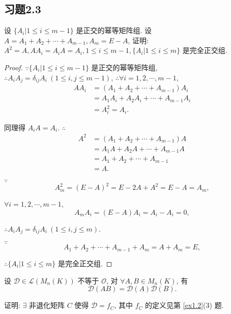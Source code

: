 \documentclass[color=black,device=normal,lang=cn,mode=geye]{elegantnote}
\begin{document}
\subsection{习题2.3}
\begin{exercise}\label{ex3.1}
    设 $\{A_i|1\leq i\leq m-1\}$ 是正交的幂等矩阵组. 设 $A=A_1+A_2+\cdots+A_{m-1},A_m=E-A$, 证明: $A^2=A,AA_i=A_iA=A_i,1\leq i\leq m-1,\{A_i|1\leq i\leq m\}$ 是完全正交组.
\end{exercise}
\begin{proof}
    $\because\{A_i|1\leq i\leq m-1\}$ 是正交的幂等矩阵组, $\therefore A_iA_j=\delta_{ij}A_i\ (1\leq i,j\leq m-1)$, $\therefore\forall i=1,2,\cdots,m-1$,
    \begin{align*}
        AA_i & =(A_1+A_2+\cdots+A_{m-1})A_i \\
        & =A_1A_i+A_2A_i+\cdots+A_{m-1}A_i \\
        & =A_i^2=A_i.
    \end{align*}

    同理得 $A_iA=A_i$. $\therefore$
    \begin{align*}
        A^2 & =(A_1+A_2+\cdots+A_{m-1})A \\
        & =A_1A+A_2A+\cdots+A_{m-1}A \\
        & =A_1+A_2+\cdots+A_{m-1} \\
        & =A.
    \end{align*}

    $\because$
    \[A_m^2=(E-A)^2=E-2A+A^2=E-A=A_m,\]

    $\forall i=1,2,\cdots,m-1$,
    \[A_mA_i=(E-A)A_i=A_i-A_i=0,\]

    $\therefore A_iA_j=\delta_{ij}A_i\ (1\leq i,j\leq m)$.
    
    $\because$
    \[A_1+A_2+\cdots+A_{m-1}+A_m=A+A_m=E,\]

    $\therefore\{A_i|1\leq i\leq m\}$ 是完全正交组.
\end{proof}
\begin{exercise}%
    设 $\mathcal{D}\in\mathcal{L}(M_n(K))$ 不等于 $\mathcal{O}$, 对 $\forall A,B\in M_n(K)$, 有
    \[\mathcal{D}(AB)=\mathcal{D}(A)\mathcal{D}(B).\]

    证明: $\exists$ 非退化矩阵 $C$ 使得 $\mathcal{D}=f_C$, 其中 $f_C$ 的定义见第 \ref{ex1.2}(3) 题.
\end{exercise}
\end{document}

